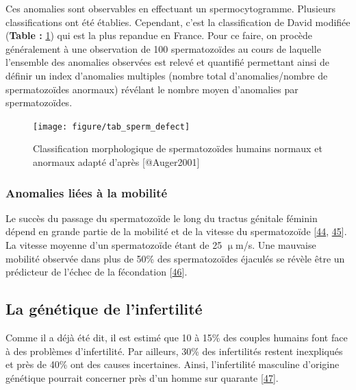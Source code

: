 \documentclass[12pt,twoside]{reedthesis}
\theoremstyle{definition}
\theoremstyle{definition}
\theoremstyle{remark}
\begin{document}
  Ces anomalies sont observables en effectuant un spermocytogramme.
  Plusieurs classifications ont été établies. Cependant, c'est la
  classification de David modifiée (\textbf{Table :}
  \ref{fig:anomaliemorphosperm}) qui est la plus repandue en France. Pour
  ce faire, on procède généralement à une observation de 100
  spermatozoïdes au cours de laquelle l'ensemble des anomalies observées
  est relevé et quantifié permettant ainsi de définir un index d'anomalies
  multiples (nombre total d'anomalies/nombre de spermatozoïdes anormaux)
  révélant le nombre moyen d'anomalies par spermatozoïdes.
  
  \newpage  
  
  \begin{figure}
  
  {\centering \texttt{[image: figure/tab\_sperm\_defect]} 
  
  }
  
  \caption[Classification morphologique de spermatozoïdes humains normaux et anormaux adapté]{Classification morphologique de spermatozoïdes humains normaux et anormaux adapté d'après [@Auger2001]}\label{fig:anomaliemorphosperm}
  \end{figure}
  
  \newpage
  
  \subsubsection{Anomalies liées à la
  mobilité}\label{anomalies-liees-a-la-mobilite}
  
  Le succès du passage du spermatozoïde le long du tractus génitale
  féminin dépend en grande partie de la mobilité et de la vitesse du
  spermatozoïde {[}\protect\hyperlink{ref-Lindholmer1974}{44},
  \protect\hyperlink{ref-Bjorndahl2010}{45}{]}. La vitesse moyenne d'un
  spermatozoïde étant de 25 \(\upmu\)m/s. Une mauvaise mobilité observée
  dans plus de 50\% des spermatozoïdes éjaculés se révèle être un
  prédicteur de l'échec de la fécondation
  {[}\protect\hyperlink{ref-Aitken1985}{46}{]}.
  
  \subsection{La génétique de
  l'infertilité}\label{la-genetique-de-linfertilite}
  
  Comme il a déjà été dit, il est estimé que 10 à 15\% des couples humains
  font face à des problèmes d'infertilité. Par ailleurs, 30\% des
  infertilités restent inexpliqués et près de 40\% ont des causes
  incertaines. Ainsi, l'infertilité masculine d'origine génétique pourrait
  concerner près d'un homme sur quarante
  {[}\protect\hyperlink{ref-Tuttelmann2011}{47}{]}.
  
\end{document}
